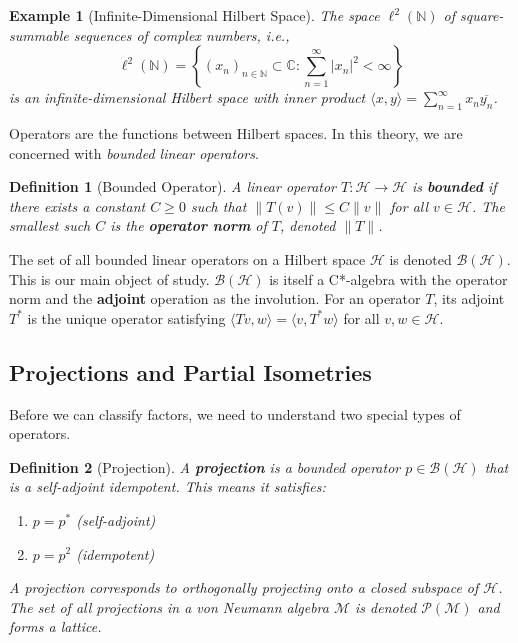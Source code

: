 \documentclass[11pt, a4paper]{article}
\theoremstyle{colored_def}
\newtheorem{definition}{Definition}[section]
\theoremstyle{colored_thm}
\theoremstyle{colored_ex}
\newtheorem{example}{Example}[section]
\newcommand{\C}{\mathbb{C}}
\newcommand{\M}{\mathcal{M}}
\newcommand{\Hil}{\mathcal{H}}
\newcommand{\B}{\mathcal{B}}
\begin{document}
\begin{example}[Infinite-Dimensional Hilbert Space]
The space $\ell^2(\mathbb{N})$ of square-summable sequences of complex numbers, i.e.,
$$ \ell^2(\mathbb{N}) = \left\{ (x_n)_{n \in \mathbb{N}} \subset \C : \sum_{n=1}^\infty |x_n|^2 < \infty \right\} $$
is an infinite-dimensional Hilbert space with inner product $\langle x, y \rangle = \sum_{n=1}^\infty x_n \overline{y_n}$.
\end{example}

Operators are the functions between Hilbert spaces. In this theory, we are concerned with \textit{bounded linear operators}.

\begin{definition}[Bounded Operator]
A linear operator $T: \Hil \to \Hil$ is \textbf{bounded} if there exists a constant $C \geq 0$ such that $\|T(v)\| \leq C\|v\|$ for all $v \in \Hil$. The smallest such $C$ is the \textbf{operator norm} of $T$, denoted $\|T\|$.
\end{definition}

The set of all bounded linear operators on a Hilbert space $\Hil$ is denoted $\B(\Hil)$. This is our main object of study. $\B(\Hil)$ is itself a C*-algebra with the operator norm and the \textbf{adjoint} operation as the involution. For an operator $T$, its adjoint $T^*$ is the unique operator satisfying $\langle Tv, w \rangle = \langle v, T^*w \rangle$ for all $v, w \in \Hil$.

\subsection{Projections and Partial Isometries}

Before we can classify factors, we need to understand two special types of operators.

\begin{definition}[Projection]
A \textbf{projection} is a bounded operator $p \in \B(\Hil)$ that is a self-adjoint idempotent. This means it satisfies:
\begin{enumerate}
    \item $p = p^*$ (self-adjoint)
    \item $p = p^2$ (idempotent)
\end{enumerate}
A projection corresponds to orthogonally projecting onto a closed subspace of $\Hil$. The set of all projections in a von Neumann algebra $\M$ is denoted $\mathcal{P}(\M)$ and forms a lattice.
\end{definition}
\end{document}
